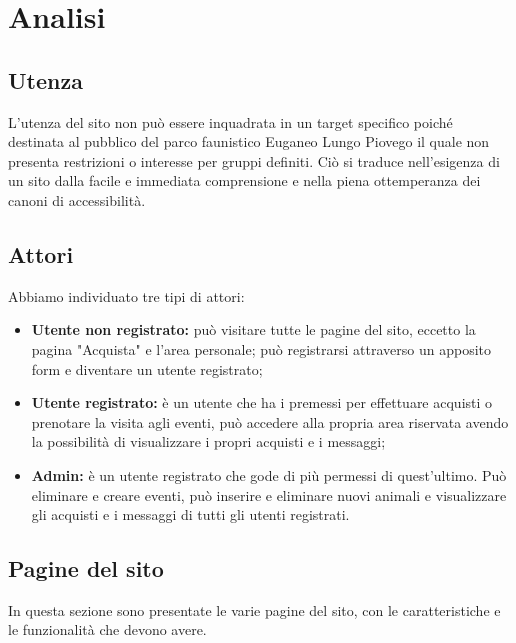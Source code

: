 \section{Analisi}

    \subsection{Utenza}
        L'utenza del sito non può essere inquadrata in un target specifico poiché destinata al pubblico del parco faunistico Euganeo Lungo Piovego il quale non presenta restrizioni o interesse per gruppi definiti. Ciò si traduce nell'esigenza di un sito dalla facile e immediata comprensione e nella piena ottemperanza dei canoni di accessibilità.

    \subsection{Attori}
        Abbiamo individuato tre tipi di attori:
        \begin{itemize}
            \item \textbf{Utente non registrato:} può visitare tutte le pagine del sito, eccetto la pagina "Acquista" e l'area personale; può registrarsi attraverso un apposito form e diventare un utente registrato;
            \item \textbf{Utente registrato:} è un utente che ha i premessi per effettuare acquisti o prenotare la visita agli eventi, può accedere alla propria area riservata avendo la possibilità di visualizzare i propri acquisti e i messaggi;
            \item \textbf{Admin:} è un utente registrato che gode di più permessi di quest'ultimo. Può eliminare e creare eventi, può inserire e eliminare nuovi animali e visualizzare gli acquisti e i messaggi di tutti gli utenti registrati.
        \end{itemize}
    
    \subsection{Pagine del sito}
        In questa sezione sono presentate le varie pagine del sito, con le caratteristiche e le funzionalità che devono avere.
